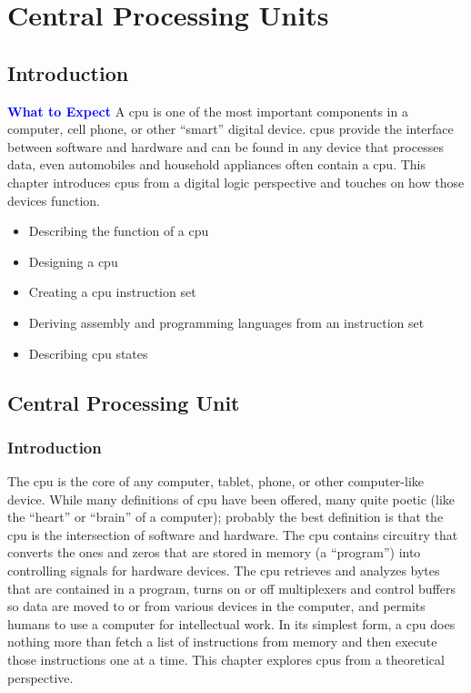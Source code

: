 \chapter{Central Processing Units}\label{ch14}
\section{Introduction}

\begin{tcolorbox}[colback=blue!5!white,colframe=blue!75!black]
	\textcolor{blue}{\textbf{What to Expect}}
	\tcblower
	A \gls{cpu} is one of the most important components in a computer, cell phone, or other ``smart'' digital device. \Glspl{cpu} provide the interface between software and hardware and can be found in any device that processes data, even automobiles and household appliances often contain a \gls{cpu}. This chapter introduces \glspl{cpu} from a digital logic perspective and touches on how those devices function.
	
	\begin{itemize}
		\item Describing the function of a \gls{cpu}
		\item Designing a \gls{cpu}
		\item Creating a \gls{cpu} instruction set 
		\item Deriving assembly and programming languages from an instruction set
		\item Describing \gls{cpu} states
	\end{itemize}
	
\end{tcolorbox}

\section{Central Processing Unit}
\label{SIM:sec:cpu}

\subsection{Introduction}
\label{SIM:subsec:intro_to_cpu}

The \gls{cpu} is the core of any computer, tablet, phone, or other computer-like device. While many definitions of \gls{cpu} have been offered, many quite poetic (like the ``heart'' or ``brain'' of a computer); probably the best definition is that the \gls{cpu} is the intersection of software and hardware. The \gls{cpu} contains circuitry that converts the ones and zeros that are stored in memory (a ``program'') into controlling signals for hardware devices. The \gls{cpu} retrieves and analyzes bytes that are contained in a program, turns on or off multiplexers and control buffers so data are moved to or from various devices in the computer, and permits humans to use a computer for intellectual work. In its simplest form, a \gls{cpu} does nothing more than fetch a list of instructions from memory and then execute those instructions one at a time. This chapter explores \glspl{cpu} from a theoretical perspective.

